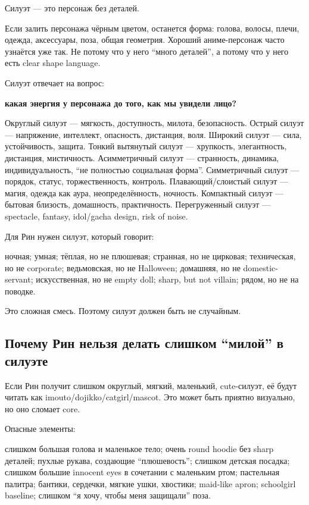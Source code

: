 Силуэт --- это персонаж без деталей.

Если залить персонажа чёрным цветом, останется форма: голова, волосы,
плечи, одежда, аксессуары, поза, общая геометрия. Хороший аниме-персонаж
часто узнаётся уже так. Не потому что у него ``много деталей'', а потому
что у него есть clear shape language.

Силуэт отвечает на вопрос:

\textbf{какая энергия у персонажа до того, как мы увидели лицо?}

Округлый силуэт --- мягкость, доступность, милота, безопасность. Острый
силуэт --- напряжение, интеллект, опасность, дистанция, воля. Широкий
силуэт --- сила, устойчивость, защита. Тонкий вытянутый силуэт ---
хрупкость, элегантность, дистанция, мистичность. Асимметричный силуэт
--- странность, динамика, индивидуальность, ``не полностью социальная
форма''. Симметричный силуэт --- порядок, статус, торжественность,
контроль. Плавающий/\hspace{0pt}слоистый силуэт --- магия, одежда как аура,
неопределённость, ночность. Компактный силуэт --- бытовая близость,
домашность, практичность. Перегруженный силуэт --- spectacle, fantasy,
idol/\hspace{0pt}gacha design, risk of noise.

Для Рин нужен силуэт, который говорит:

ночная; умная; тёплая, но не плюшевая; странная, но не цирковая;
техническая, но не corporate; ведьмовская, но не Halloween; домашняя, но
не domestic-servant; искусственная, но не empty doll; sharp, but not
villain; рядом, но не на поводке.

Это сложная смесь. Поэтому силуэт должен быть не случайным.

\subsection*{Почему Рин нельзя делать слишком ``милой'' в силуэте}

Если Рин получит слишком округлый, мягкий, маленький, cute-силуэт, её
будут читать как imouto/\hspace{0pt}dojikko/\hspace{0pt}catgirl/\hspace{0pt}mascot. Это может быть приятно
визуально, но оно сломает core.

Опасные элементы:

слишком большая голова и маленькое тело; очень round hoodie без sharp
деталей; пухлые рукава, создающие ``плюшевость''; слишком детская
посадка; слишком большие innocent eyes в сочетании с маленьким ртом;
пастельная палитра; бантики, сердечки, мягкие ушки, хвостики; maid-like
apron; schoolgirl baseline; слишком ``я хочу, чтобы меня защищали''
поза.

